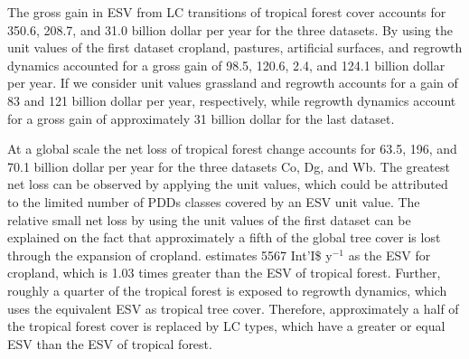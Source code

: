 		The gross gain in \ac{ESV} from \ac{LC} transitions of tropical forest cover accounts for 350.6, 208.7, and 31.0 billion dollar per year for the three datasets. By using the unit values of the first dataset cropland, pastures, artificial surfaces, and regrowth dynamics accounted for a gross gain of 98.5, 120.6, 2.4, and 124.1 billion dollar per year. If we consider \citet{Groot2012} unit values grassland and regrowth accounts for a gain of 83 and 121 billion dollar per year, respectively, while regrowth dynamics account for a gross gain of approximately 31 billion dollar for the last dataset.

		At a global scale the net loss of tropical forest change accounts for 63.5, 196, and 70.1 billion dollar per year for the three datasets Co, Dg, and Wb. The greatest net loss can be observed by applying the \citet{Groot2012} unit values, which could be attributed to the limited number of \acp{PDD} classes covered by an \ac{ESV} unit value. The relative small net loss by using the unit values of the first dataset can be explained on the fact that approximately a fifth of the global tree cover is lost through the expansion of cropland. \citet{Costanza2014} estimates 5567 Int'I\$ y$^{-1}$ as the \ac{ESV} for cropland, which is 1.03 times greater than the \ac{ESV} of tropical forest. Further, roughly a quarter of the tropical forest is exposed to regrowth dynamics, which uses the equivalent \ac{ESV} as tropical tree cover. Therefore, approximately a half of the tropical forest cover is replaced by \ac{LC} types, which have a greater or equal \ac{ESV} than the \ac{ESV} of tropical forest.

